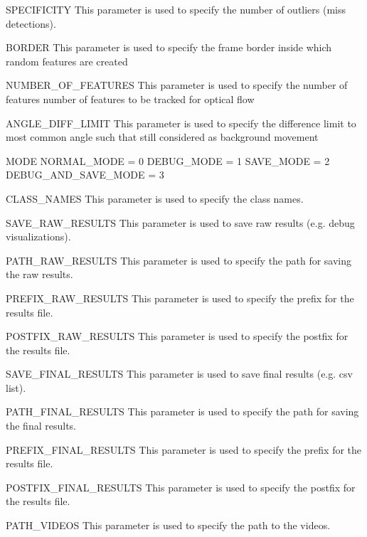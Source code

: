 \documentclass[letterpaper,10pt,english,openany,oneside]{sphinxmanual}
\begin{document}
SPECIFICITY
This parameter is used to specify the number of outliers (miss detections).



BORDER
This parameter is used to specify the frame border inside which random features are created



NUMBER\_OF\_FEATURES
This parameter is used to specify the number of features number of features to be tracked for optical flow



ANGLE\_DIFF\_LIMIT
This parameter is used to specify the difference limit to most common angle such that still considered as background movement



MODE
NORMAL\_MODE = 0
DEBUG\_MODE = 1
SAVE\_MODE = 2
DEBUG\_AND\_SAVE\_MODE = 3



CLASS\_NAMES
This parameter is used to specify the class names.



SAVE\_RAW\_RESULTS
This parameter is used to save raw results (e.g. debug visualizations).



PATH\_RAW\_RESULTS
This parameter is used to specify the path for saving the raw results.



PREFIX\_RAW\_RESULTS
This parameter is used to specify the prefix for the results file.



POSTFIX\_RAW\_RESULTS
This parameter is used to specify the postfix for the results file.



SAVE\_FINAL\_RESULTS
This parameter is used to save final results (e.g. csv list).



PATH\_FINAL\_RESULTS
This parameter is used to specify the path for saving the final results.



PREFIX\_FINAL\_RESULTS
This parameter is used to specify the prefix for the results file.



POSTFIX\_FINAL\_RESULTS
This parameter is used to specify the postfix for the results file.



PATH\_VIDEOS
This parameter is used to specify the path to the videos.
\end{document}
